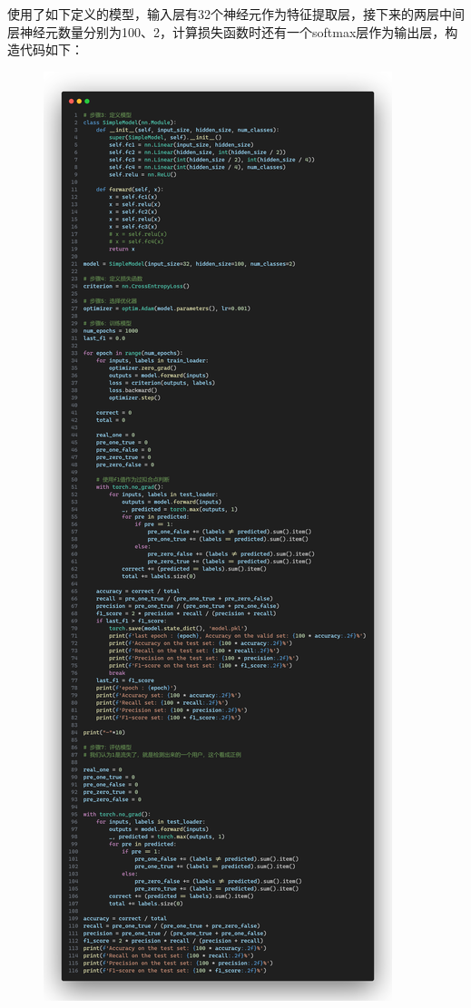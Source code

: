 \documentclass{article}
\begin{document}
使用了如下定义的模型，输入层有32个神经元作为特征提取层，接下来的两层中间层神经元数量分别为100、2，计算损失函数时还有一个softmax层作为输出层，构造代码如下：
\begin{figure}[H]
	\centering
	\includegraphics[width=\textwidth]{./img/mlp2.png}
\end{figure}
\end{document}
